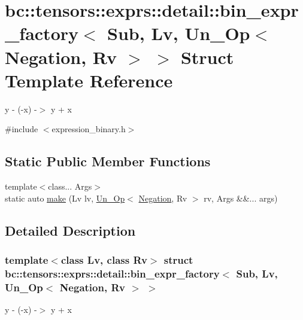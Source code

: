 \hypertarget{structbc_1_1tensors_1_1exprs_1_1detail_1_1bin__expr__factory_3_01Sub_00_01Lv_00_01Un__Op_3_01Negation_00_01Rv_01_4_01_4}{}\section{bc\+:\+:tensors\+:\+:exprs\+:\+:detail\+:\+:bin\+\_\+expr\+\_\+factory$<$ Sub, Lv, Un\+\_\+\+Op$<$ Negation, Rv $>$ $>$ Struct Template Reference}
\label{structbc_1_1tensors_1_1exprs_1_1detail_1_1bin__expr__factory_3_01Sub_00_01Lv_00_01Un__Op_3_01Negation_00_01Rv_01_4_01_4}


y -\/ (-\/x) -\/$>$ y + x  




{\ttfamily \#include $<$expression\+\_\+binary.\+h$>$}

\subsection*{Static Public Member Functions}
\begin{DoxyCompactItemize}
\item 
{\footnotesize template$<$class... Args$>$ }\\static auto \hyperlink{structbc_1_1tensors_1_1exprs_1_1detail_1_1bin__expr__factory_3_01Sub_00_01Lv_00_01Un__Op_3_01Negation_00_01Rv_01_4_01_4_af5b947051f47ac53f36b8b0e07708c50}{make} (Lv lv, \hyperlink{structbc_1_1tensors_1_1exprs_1_1Un__Op}{Un\+\_\+\+Op}$<$ \hyperlink{structbc_1_1oper_1_1Negation}{Negation}, Rv $>$ rv, Args \&\&... args)
\end{DoxyCompactItemize}


\subsection{Detailed Description}
\subsubsection*{template$<$class Lv, class Rv$>$\newline
struct bc\+::tensors\+::exprs\+::detail\+::bin\+\_\+expr\+\_\+factory$<$ Sub, Lv, Un\+\_\+\+Op$<$ Negation, Rv $>$ $>$}

y -\/ (-\/x) -\/$>$ y + x 

